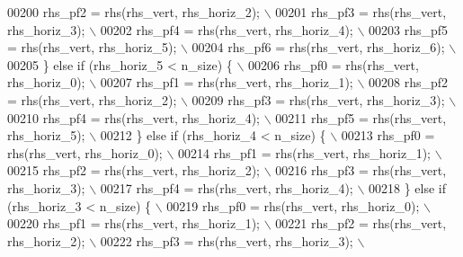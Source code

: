 \begin{DoxyCode}
00200 \textcolor{preprocessor}{        rhs\_pf2 = rhs(rhs\_vert, rhs\_horiz\_2);                   \(\backslash\)}
00201 \textcolor{preprocessor}{        rhs\_pf3 = rhs(rhs\_vert, rhs\_horiz\_3);                   \(\backslash\)}
00202 \textcolor{preprocessor}{        rhs\_pf4 = rhs(rhs\_vert, rhs\_horiz\_4);                   \(\backslash\)}
00203 \textcolor{preprocessor}{        rhs\_pf5 = rhs(rhs\_vert, rhs\_horiz\_5);                   \(\backslash\)}
00204 \textcolor{preprocessor}{        rhs\_pf6 = rhs(rhs\_vert, rhs\_horiz\_6);                   \(\backslash\)}
00205 \textcolor{preprocessor}{      \} else if (rhs\_horiz\_5 < n\_size) \{                        \(\backslash\)}
00206 \textcolor{preprocessor}{        rhs\_pf0 = rhs(rhs\_vert, rhs\_horiz\_0);                   \(\backslash\)}
00207 \textcolor{preprocessor}{        rhs\_pf1 = rhs(rhs\_vert, rhs\_horiz\_1);                   \(\backslash\)}
00208 \textcolor{preprocessor}{        rhs\_pf2 = rhs(rhs\_vert, rhs\_horiz\_2);                   \(\backslash\)}
00209 \textcolor{preprocessor}{        rhs\_pf3 = rhs(rhs\_vert, rhs\_horiz\_3);                   \(\backslash\)}
00210 \textcolor{preprocessor}{        rhs\_pf4 = rhs(rhs\_vert, rhs\_horiz\_4);                   \(\backslash\)}
00211 \textcolor{preprocessor}{        rhs\_pf5 = rhs(rhs\_vert, rhs\_horiz\_5);                   \(\backslash\)}
00212 \textcolor{preprocessor}{      \} else if (rhs\_horiz\_4 < n\_size) \{                        \(\backslash\)}
00213 \textcolor{preprocessor}{        rhs\_pf0 = rhs(rhs\_vert, rhs\_horiz\_0);                   \(\backslash\)}
00214 \textcolor{preprocessor}{        rhs\_pf1 = rhs(rhs\_vert, rhs\_horiz\_1);                   \(\backslash\)}
00215 \textcolor{preprocessor}{        rhs\_pf2 = rhs(rhs\_vert, rhs\_horiz\_2);                   \(\backslash\)}
00216 \textcolor{preprocessor}{        rhs\_pf3 = rhs(rhs\_vert, rhs\_horiz\_3);                   \(\backslash\)}
00217 \textcolor{preprocessor}{        rhs\_pf4 = rhs(rhs\_vert, rhs\_horiz\_4);                   \(\backslash\)}
00218 \textcolor{preprocessor}{      \} else if (rhs\_horiz\_3 < n\_size) \{                        \(\backslash\)}
00219 \textcolor{preprocessor}{        rhs\_pf0 = rhs(rhs\_vert, rhs\_horiz\_0);                   \(\backslash\)}
00220 \textcolor{preprocessor}{        rhs\_pf1 = rhs(rhs\_vert, rhs\_horiz\_1);                   \(\backslash\)}
00221 \textcolor{preprocessor}{        rhs\_pf2 = rhs(rhs\_vert, rhs\_horiz\_2);                   \(\backslash\)}
00222 \textcolor{preprocessor}{        rhs\_pf3 = rhs(rhs\_vert, rhs\_horiz\_3);                   \(\backslash\)}

\end{DoxyCode}
